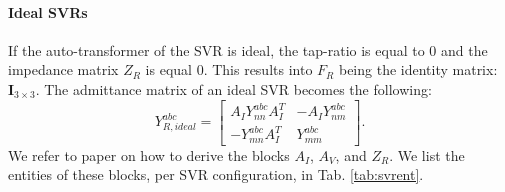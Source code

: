 \documentclass[10pt,journal]{article}
\begin{document}
\paragraph{Ideal SVRs}
If the auto-transformer of the SVR is ideal, the tap-ratio is equal to $0$ and the impedance matrix $Z_R$ is equal $0$. This results into $F_R$ being the identity matrix: $\mathbf{I}_{3\times 3}$. The admittance matrix of an ideal SVR becomes the following:
\begin{equation}
    Y^{abc}_{R,ideal}
= \begin{bmatrix}
A_I Y^{abc}_{nn}A_I^T & -A_I  Y^{abc}_{nm} \\[5pt]
-Y^{abc}_{mn}A_I^T & Y^{abc}_{mm}
\end{bmatrix}.
\end{equation}
We refer to paper  on how to derive the blocks $A_I$, $A_V$, and $Z_R$. We list the entities of these blocks, per SVR configuration, in Tab. \ref{tab:svrent}.
\end{document}
